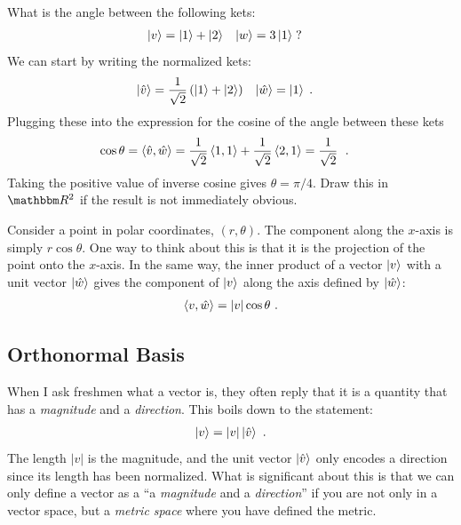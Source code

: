 \documentclass[12pt]{article}
\begin{document}
\begin{example}
What is the angle between the following kets:
\begin{align}
    \left|v\right\rangle &= \left|1\right\rangle + \left|2\right\rangle 
    &
    \left|w\right\rangle &= 3 \left|1\right\rangle \; ?
\end{align}
We can start by writing the normalized kets:
\begin{align}
    \left|\hat v\right\rangle &= \frac{1}{\sqrt{2}}\left(\left|1\right\rangle + \left|2\right\rangle \right)
    &
    \left|\hat w\right\rangle &= \left|1\right\rangle \; .
\end{align}
Plugging these into the expression for the cosine of the angle between these kets
\begin{align}
   \cos\theta = \langle \hat v, \hat w \rangle &= \frac{1}{\sqrt{2}}\, \langle 1, 1\rangle + \frac{1}{\sqrt{2}}\, \langle 2, 1 \rangle = \frac{1}{\sqrt{2}}\; \ .
\end{align}
Taking the positive value of inverse cosine gives $\theta = \pi/4$. Draw this in $\RR^2$ if the result is not immediately obvious.
\end{example}

\begin{example}\label{eg:component:along:an:axis}
Consider a point in polar coordinates, $(r,\theta)$. The component along the $x$-axis is simply $r\cos\theta$. One way to think about this is that it is the projection of the point onto the $x$-axis. In the same way, the inner product of a vector $\left|v\right\rangle$ with a unit vector $\left|\hat w\right\rangle$ gives the component of $\left|v\right\rangle$ along the axis defined by $\left|\hat{w}\right\rangle$:
\begin{align}
    \langle v , \hat{w} \rangle = |v| \cos\theta \ .
\end{align}
\end{example}




\subsection{Orthonormal Basis}
\label{sec:metric:orthonormal}

When I ask freshmen what a vector is, they often reply that it is a quantity that has a \emph{magnitude} and a \emph{direction}. This boils down to the statement:
\begin{align}
    \left|v\right\rangle = |v| \left|\hat{v}\right\rangle \ .
\end{align}
The length $|v|$ is the magnitude, and the unit vector $\left|\hat{v}\right\rangle$ only encodes a direction since its length has been normalized. What is significant about this is that we can only define a vector as a ``a \emph{magnitude} and a \emph{direction}'' if you are not only in a vector space, but a \emph{metric space} where you have defined the metric.
\end{document}
